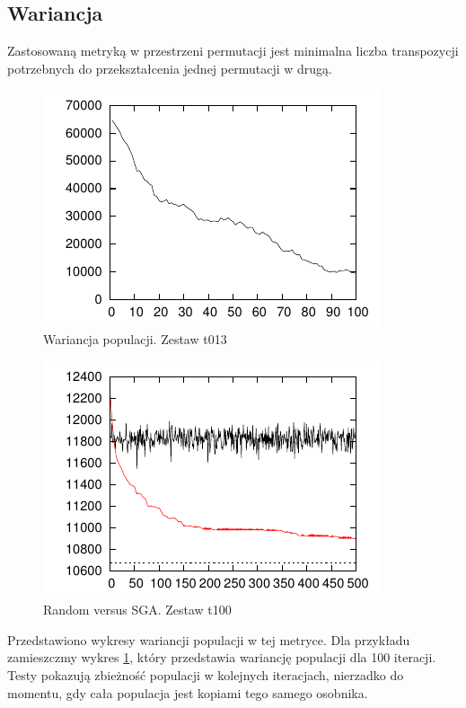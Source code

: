 \documentclass[12pt]{article}
\begin{document}
\subsection{Wariancja}

Zastosowaną metryką w przestrzeni permutacji jest minimalna liczba
transpozycji potrzebnych do przekształcenia jednej permutacji w drugą.

\begin{figure}[t]
  \centering
  \includegraphics[scale=1.5]{plots/plot2.pdf}
  \caption{Wariancja populacji. Zestaw t013}
  \label{pic:plot2}
\end{figure}

\begin{figure}[h!]
  \centering
  \includegraphics[scale=1.5]{plots/plot3.pdf}
  \caption{Random versus SGA. Zestaw t100}
  \label{pic:plot3}
\end{figure}

Przedstawiono wykresy wariancji populacji w tej metryce. 
Dla przykładu zamieszczmy wykres \ref{pic:plot2}, który 
przedstawia wariancję populacji dla 100 iteracji. Testy
pokazują zbieżność populacji w kolejnych iteracjach, nierzadko do
momentu, gdy cała populacja jest kopiami tego samego osobnika.
\end{document}
